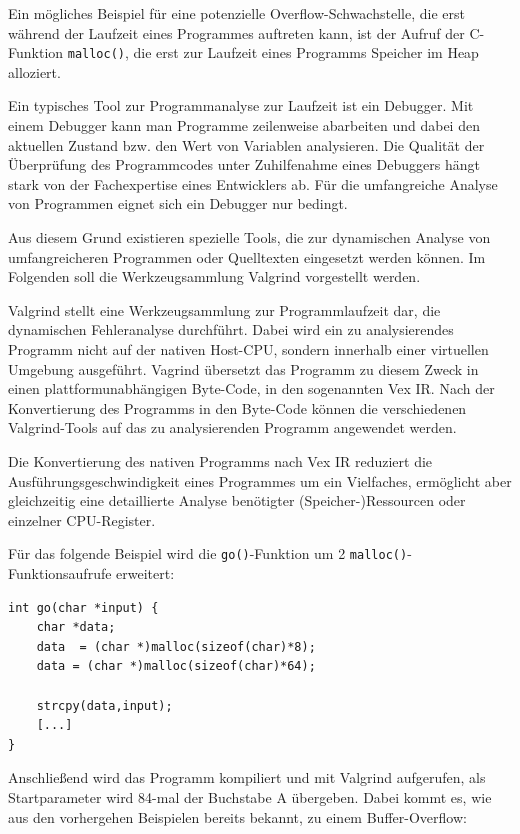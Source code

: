 Ein mögliches Beispiel für eine potenzielle Overflow-Schwachstelle, die 
erst während der Laufzeit eines Programmes auftreten kann, ist der 
Aufruf der C-Funktion \texttt{malloc()}, die erst zur Laufzeit eines 
Programms Speicher im Heap alloziert.

Ein typisches Tool zur Programmanalyse zur Laufzeit ist ein Debugger. 
Mit einem Debugger kann man Programme zeilenweise abarbeiten und dabei 
den aktuellen Zustand bzw. den Wert von Variablen analysieren. Die Qualität 
der Überprüfung des Programmcodes unter Zuhilfenahme eines Debuggers 
hängt stark von der Fachexpertise eines Entwicklers ab. Für die umfangreiche 
Analyse von Programmen eignet sich ein Debugger nur bedingt.

Aus diesem Grund existieren spezielle Tools, die zur dynamischen Analyse 
von umfangreicheren Programmen oder Quelltexten eingesetzt werden können. 
Im Folgenden soll die Werkzeugsammlung Valgrind vorgestellt werden.


Valgrind stellt eine Werkzeugsammlung zur Programmlaufzeit dar, die 
dynamischen Fehleranalyse durchführt. Dabei wird ein zu analysierendes 
Programm nicht auf der nativen Host-CPU, sondern innerhalb einer 
virtuellen Umgebung ausgeführt.
Vagrind übersetzt das Programm zu diesem Zweck in einen 
plattformunabhängigen Byte-Code, in den sogenannten Vex IR. Nach der 
Konvertierung des Programms in den Byte-Code können die verschiedenen 
Valgrind-Tools auf das zu analysierenden Programm angewendet werden.

Die Konvertierung des nativen Programms nach Vex IR reduziert die 
Ausführungsgeschwindigkeit eines Programmes um ein Vielfaches, 
ermöglicht aber gleichzeitig eine detaillierte Analyse  benötigter 
(Speicher-)Ressourcen oder einzelner CPU-Register.

Für das folgende Beispiel wird die \texttt{go()}-Funktion um 2 
\texttt{malloc()}-Funktionsaufrufe erweitert:

\begin{lstlisting}[basicstyle=\ttfamily\footnotesize]
int go(char *input) {
    char *data;	
    data  = (char *)malloc(sizeof(char)*8);
    data = (char *)malloc(sizeof(char)*64);

    strcpy(data,input);
    [...]
}
\end{lstlisting}

Anschließend wird das Programm kompiliert und mit Valgrind aufgerufen, 
als Startparameter wird 84-mal der Buchstabe A übergeben. Dabei kommt 
es, wie aus den vorhergehen Beispielen bereits bekannt, zu einem 
Buffer-Overflow:


